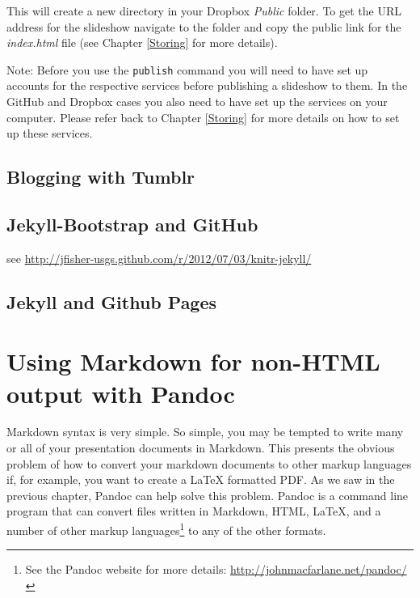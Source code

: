 \noindent This will create a new directory in your Dropbox \emph{Public} folder. To get the URL address for the slideshow navigate to the folder and copy the public link for the \emph{index.html} file (see Chapter \ref{Storing} for more details).

Note: Before you use the \verb|publish| command you will need to have set up accounts for the respective services before publishing a slideshow to them. In the GitHub and Dropbox cases you also need to have set up the services on your computer. Please refer back to Chapter \ref{Storing} for more details on how to set up these services.

\subsection{Blogging with Tumblr}

\subsection{Jekyll-Bootstrap and GitHub}

see \url{http://jfisher-usgs.github.com/r/2012/07/03/knitr-jekyll/}

\subsection{Jekyll and Github Pages}

\section{Using Markdown for non-HTML output with Pandoc}

Markdown syntax is very simple. So simple, you may be tempted to write many or all of your presentation documents in Markdown. This presents the obvious problem of how to convert your markdown documents to other markup languages if, for example, you want to create a LaTeX formatted PDF. As we saw in the previous chapter, Pandoc can help solve this problem. Pandoc is a command line program that can convert files written in Markdown, HTML, LaTeX, and a number of other markup languages\footnote{See the Pandoc website for more details: \url{http://johnmacfarlane.net/pandoc/}} to any of the other formats. 


  
